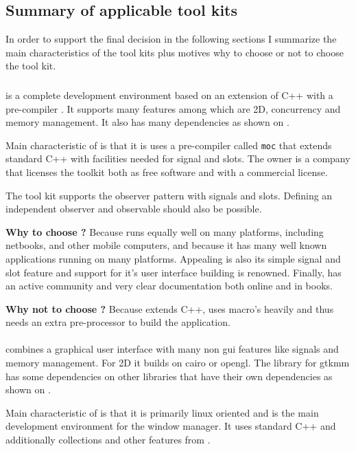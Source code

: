 \subsection{Summary of applicable tool kits}

In order to support the final decision in the following sections I summarize 
the main characteristics of the tool kits plus motives why to choose or 
not to choose the tool kit.

\subsubsection{} 
is a complete development environment based on an extension of C++ with a
 pre-compiler . It supports many features among which are
2D, concurrency and memory management. It also has many dependencies as shown
on \cite{qt:qt-dep}.

Main characteristic of  is that it is uses a pre-compiler called \texttt{moc}
that extends standard C++ with facilities needed for signal and slots. The owner is a 
company  that licenses the  toolkit both as free software and 
with a commercial license.

The tool kit  supports the observer pattern with signals and slots. 
Defining an independent observer and observable should also be possible.

\textbf{Why to choose ?} Because  runs equally well on many platforms,
including netbooks, and other mobile computers, and because it has many well known
applications running on many platforms. Appealing is also its simple
signal and slot feature and support for it's user interface building is renowned.
Finally,  has an active community and very clear documentation both
online and in books. 

\textbf{Why not to choose ?} Because  extends C++, uses macro's heavily
and thus needs an extra pre-processor to build the application.

\paragraph{}
combines a graphical user interface with many non gui features like signals 
and memory management. For 2D it builds on cairo or opengl. The library for 
gtkmm has some dependencies on other libraries that have their own dependencies
as shown on \cite{gtkmm:gtk+-dep}.

Main characteristic of  is that it is primarily linux oriented and
is the main development environment for the  window manager. It uses 
standard C++ and additionally collections and other features from .

